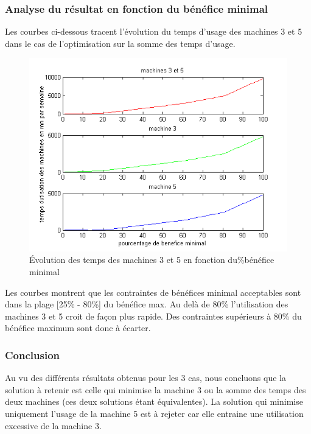 \documentclass[12pt]{article}
\begin{document}
\subsubsection*{Analyse du résultat en fonction du bénéfice minimal}
Les courbes ci-dessous tracent l'évolution du temps d'usage des machines 3 et 5 dans le cas de l'optimisation sur la somme des temps d'usage. 
\begin{figure}[H]
    \begin{center}
        \includegraphics[scale=0.8]{plots_partie1/plot_personnel.png}
        \caption{
            \label{fig} Évolution des temps des machines 3 et 5 en fonction du\%bénéfice minimal
        }
    \end{center}
\end{figure} 
Les courbes montrent que les contraintes de bénéfices minimal acceptables sont dans la plage [25\% - 80\%] du bénéfice max. Au delà de 80\% l'utilisation des machines 3 et 5 croit de façon plus rapide. Des contraintes supérieurs à 80\% du bénéfice maximum sont donc à écarter.  \\

\subsubsection{Conclusion}
Au vu des différents résultats obtenus pour les 3 cas, nous concluons que la solution à retenir est celle qui minimise la machine 3 ou la somme des temps des deux machines (ces deux solutions étant équivalentes).  La solution qui minimise uniquement l'usage de la machine 5 est à rejeter car elle entraine une utilisation excessive de la machine 3. 
\end{document}
